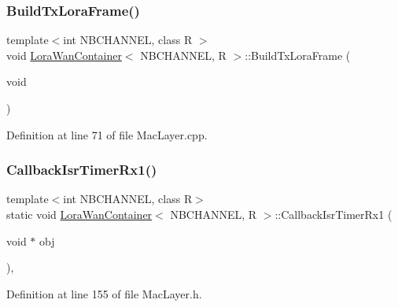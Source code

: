 \subsubsection{\texorpdfstring{Build\+Tx\+Lora\+Frame()}{BuildTxLoraFrame()}}
{\footnotesize\ttfamily template$<$int N\+B\+C\+H\+A\+N\+N\+EL, class R $>$ \\
void \mbox{\hyperlink{class_lora_wan_container}{Lora\+Wan\+Container}}$<$ N\+B\+C\+H\+A\+N\+N\+EL, R $>$\+::Build\+Tx\+Lora\+Frame (\begin{DoxyParamCaption}\item[{void}]{ }\end{DoxyParamCaption})}



Definition at line 71 of file Mac\+Layer.\+cpp.

\mbox{\label{class_lora_wan_container_a9fd5d073c605e78e404c4aa7caa6a228}} 
\subsubsection{\texorpdfstring{Callback\+Isr\+Timer\+Rx1()}{CallbackIsrTimerRx1()}}
{\footnotesize\ttfamily template$<$int N\+B\+C\+H\+A\+N\+N\+EL, class R$>$ \\
static void \mbox{\hyperlink{class_lora_wan_container}{Lora\+Wan\+Container}}$<$ N\+B\+C\+H\+A\+N\+N\+EL, R $>$\+::Callback\+Isr\+Timer\+Rx1 (\begin{DoxyParamCaption}\item[{void $\ast$}]{obj }\end{DoxyParamCaption})\hspace{0.3cm}{\ttfamily [inline]}, {\ttfamily [static]}}



Definition at line 155 of file Mac\+Layer.\+h.

\mbox{\label{class_lora_wan_container_a49723c3a1e4fbff723372d8f097c45e9}} 
